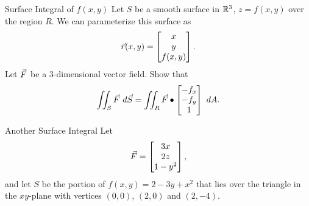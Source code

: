 \begin{exercise}{Surface Integral of $f(x,y)$}
Let $S$ be a smooth surface in $\mathbb{R}^3$, $z=f(x,y)$ over the region $R$. We can parameterize this surface as $$\vec{r}(x,y)=\begin{bmatrix}x\\y\\f(x,y)\end{bmatrix}.$$ Let $\vec{F}$ be a 3-dimensional vector field. Show that $$\iint_S \vec{F} \ d\vec{S}=\iint_R \vec{F}\bullet \begin{bmatrix}-f_x\\-f_y\\1\end{bmatrix}\ dA.$$
\end{exercise}

\begin{pexercise}{Another Surface Integral}
Let $$\vec{F}=\begin{bmatrix}3x\\2z\\1-y^2\end{bmatrix}, $$ and let $S$ be the portion of $f(x,y)=2-3y+x^2$ that lies over the triangle in the $xy$-plane with vertices $(0,0)$, $(2,0)$ and $(2,-4)$. 
\end{pexercise}
